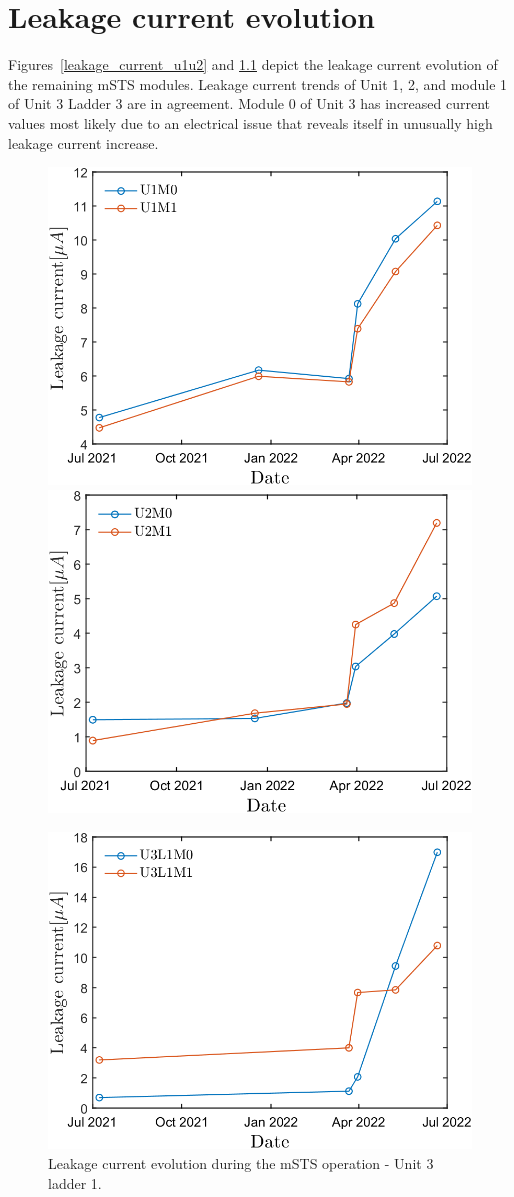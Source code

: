 \chapter{Leakage current evolution}
\label{Current}
Figures~\ref{leakage_current_u1u2} and \ref{leakage_current_u3l1} depict the leakage current evolution of the remaining \gls{mSTS} modules. Leakage current trends of Unit 1, 2, and module 1 of Unit 3 Ladder 3 are in agreement. Module 0 of Unit 3 has increased current values most likely due to an electrical issue that reveals itself in unusually high leakage current increase. 
\begin{figure}[h!]
\centering
\includegraphics[width=0.47\columnwidth]{Chapter6/DCS/images/sensors/U1_leakage.png}
\includegraphics[width=0.47\columnwidth]{Chapter6/DCS/images/sensors/U2_leakage.png}
\caption{Leakage current evolution during the \gls{mSTS} operation - Unit 1 and unit 2.}
\label{leakage_current_u1u2}
\includegraphics[width=0.5\columnwidth]{Chapter6/DCS/images/sensors/U3L1_leakage.png}
\caption{Leakage current evolution during the \gls{mSTS} operation - Unit 3 ladder 1.}
\label{leakage_current_u3l1}
\end{figure}



